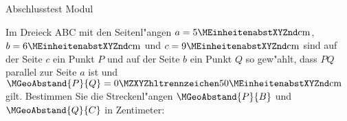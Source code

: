 \begin{MTest}{Abschlusstest Modul }
\begin{MExercise} %
Im Dreieck ABC mit den Seitenl"angen 
$a = 5\MEinheit{cm}$,
$b = 6\MEinheit{cm}$ und
$c = 9\MEinheit{cm}$
sind auf der Seite $c$ ein Punkt $P$ und auf der Seite $b$ ein Punkt $Q$ so
gew"ahlt, dass $PQ$ parallel zur Seite $a$ ist und 
$\MGeoAbstand{P}{Q} = \MZahl{0}{50}\MEinheit{cm}$ gilt. Bestimmen Sie die 
Streckenl"angen $\MGeoAbstand{P}{B}$ und $\MGeoAbstand{Q}{C}$ in Zentimeter:
\par
\begin{MExerciseItems}
\item {}
\item {}
\end{MExerciseItems}
\end{MExercise}



\end{MTest}

